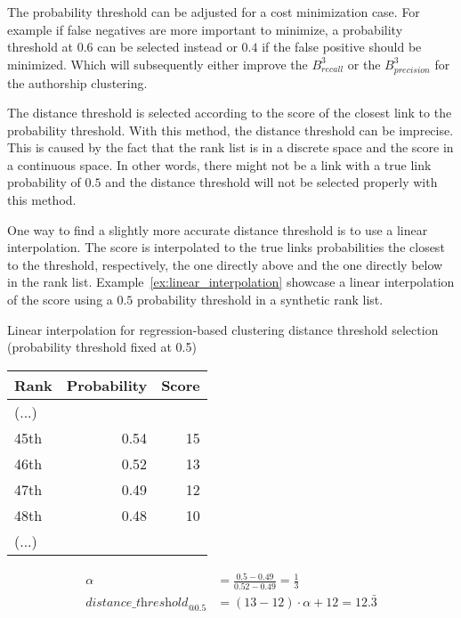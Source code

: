 The probability threshold can be adjusted for a cost minimization case.
For example if false negatives are more important to minimize, a probability threshold at $0.6$ can be selected instead or $0.4$ if the false positive should be minimized.
Which will subsequently either improve the $B^3_{recall}$ or the $B^3_{precision}$ for the authorship clustering.

The distance threshold is selected according to the score of the closest link to the probability threshold.
With this method, the distance threshold can be imprecise.
This is caused by the fact that the rank list is in a discrete space and the score in a continuous space.
In other words, there might not be a link with a true link probability of $0.5$ and the distance threshold will not be selected properly with this method.

One way to find a slightly more accurate distance threshold is to use a linear interpolation.
The score is interpolated to the true links probabilities the closest to the threshold, respectively, the one directly above and the one directly below in the rank list.
Example~\ref{ex:linear_interpolation} showcase a linear interpolation of the score using a $0.5$ probability threshold in a synthetic rank list.

\begin{example}
  \centering
  \caption{Linear interpolation for regression-based clustering distance threshold selection (probability threshold fixed at 0.5)}
  \label{ex:linear_interpolation}

  \begin{subexample}{\linewidth}
    \centering
    \begin{tabular}{l r r}
      \toprule
      Rank & Probability & Score \\
      \midrule
      (...) & &\\
      45th & 0.54 & 15 \\
      46th & 0.52 & 13 \\
      47th & 0.49 & 12 \\
      48th & 0.48 & 10 \\
      (...) & & \\
      \bottomrule
    \end{tabular}
  \end{subexample}

  \vspace{0.5cm}

  \begin{subexample}{\linewidth}
    \centering
    \begin{align*}
        \alpha &= \frac{0.5 - 0.49}{0.52 - 0.49} = \frac{1}{3} \\
        \textit{distance\_threshold}_{@0.5} &= (13 - 12) \cdot \alpha + 12 = 12.\bar{3}
    \end{align*}
  \end{subexample}
\end{example}


